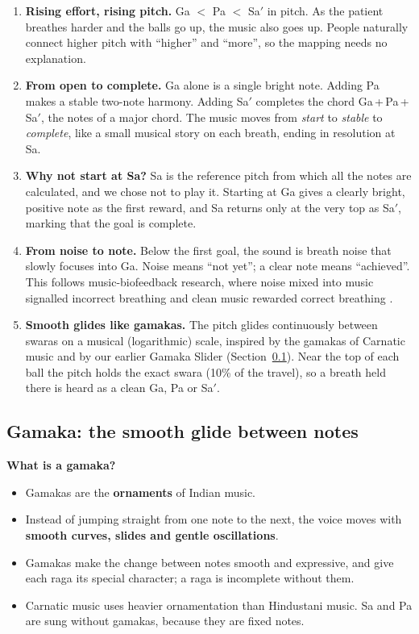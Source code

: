 \documentclass[12pt,a4paper]{article}
\newcommand{\Sah}{Sa\ensuremath{'}}     %
\begin{document}
\begin{enumerate}
  \item \textbf{Rising effort, rising pitch.} Ga $<$ Pa $<$ \Sah{} in pitch. As the patient breathes harder and the balls go up, the music also goes up. People naturally connect higher pitch with ``higher'' and ``more'', so the mapping needs no explanation.
  \item \textbf{From open to complete.} Ga alone is a single bright note. Adding Pa makes a stable two-note harmony. Adding \Sah{} completes the chord Ga\,+\,Pa\,+\,\Sah, the notes of a major chord. The music moves from \emph{start} to \emph{stable} to \emph{complete}, like a small musical story on each breath, ending in resolution at Sa.
  \item \textbf{Why not start at Sa?} Sa is the reference pitch from which all the notes are calculated, and we chose not to play it. Starting at Ga gives a clearly bright, positive note as the first reward, and Sa returns only at the very top as \Sah, marking that the goal is complete.
  \item \textbf{From noise to note.} Below the first goal, the sound is breath noise that slowly focuses into Ga. Noise means ``not yet''; a clear note means ``achieved''. This follows music-biofeedback research, where noise mixed into music signalled incorrect breathing and clean music rewarded correct breathing \cite{bhandari}.
  \item \textbf{Smooth glides like gamakas.} The pitch glides continuously between swaras on a musical (logarithmic) scale, inspired by the gamakas of Carnatic music and by our earlier Gamaka Slider (Section~\ref{sec:gamaka}). Near the top of each ball the pitch holds the exact swara (10\% of the travel), so a breath held there is heard as a clean Ga, Pa or \Sah.
\end{enumerate}

\subsection{Gamaka: the smooth glide between notes}
\label{sec:gamaka}
\textbf{What is a gamaka?}
\begin{itemize}
  \item Gamakas are the \textbf{ornaments} of Indian music.
  \item Instead of jumping straight from one note to the next, the voice moves with \textbf{smooth curves, slides and gentle oscillations}.
  \item Gamakas make the change between notes smooth and expressive, and give each raga its special character; a raga is incomplete without them.
  \item Carnatic music uses heavier ornamentation than Hindustani music. Sa and Pa are sung without gamakas, because they are fixed notes.
\end{itemize}
\end{document}
